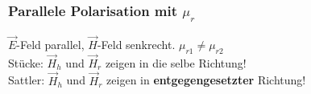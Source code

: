 %
\newcolumn
\subsubsection{Parallele Polarisation mit $\mu_r$}
\begin{center}
	
\end{center}
$\vec{E}$-Feld parallel, $ \vec{H}$-Feld senkrecht. \qquad $ \mu_{r1} \neq \mu_{r2} $\\

Stücke: $\vec{H}_h$ und $ \vec{H}_r$ zeigen in die selbe Richtung!\\
Sattler: $\vec{H}_h$ und $ \vec{H}_r$ zeigen in \textbf{entgegengesetzter} Richtung!\\

